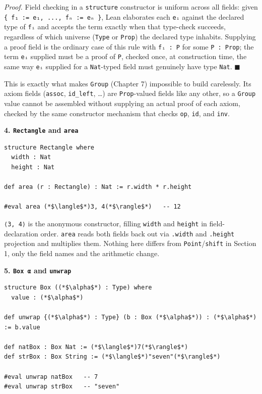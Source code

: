 \emph{Proof.} Field checking in a \texttt{structure} constructor is uniform across all fields: given \texttt{\{ f₁ := e₁, ..., fₙ := eₙ \}}, Lean elaborates each \texttt{eᵢ} against the declared type of \texttt{fᵢ} and accepts the term exactly when that type-check succeeds, regardless of which universe (\texttt{Type} or \texttt{Prop}) the declared type inhabits. Supplying a proof field is the ordinary case of this rule with \texttt{fᵢ : P} for some \texttt{P : Prop}; the term \texttt{eᵢ} supplied must be a proof of \texttt{P}, checked once, at construction time, the same way \texttt{eᵢ} supplied for a \texttt{Nat}-typed field must genuinely have type \texttt{Nat}. \(\blacksquare\)

This is exactly what makes \texttt{Group} (Chapter 7) impossible to build carelessly. Its axiom fields (\texttt{assoc}, \texttt{id\_\allowbreak{}left}, \ldots) are \texttt{Prop}-valued fields like any other, so a \texttt{Group} value cannot be assembled without supplying an actual proof of each axiom, checked by the same constructor mechanism that checks \texttt{op}, \texttt{id}, and \texttt{inv}.

\textbf{4. \texttt{Rectangle} and \texttt{area}}

\begin{lstlisting}
structure Rectangle where
  width : Nat
  height : Nat

def area (r : Rectangle) : Nat := r.width * r.height

#eval area (*$\langle$*)3, 4(*$\rangle$*)   -- 12
\end{lstlisting}

\texttt{⟨3, 4⟩} is the anonymous constructor, filling \texttt{width} and \texttt{height} in field-declaration order. \texttt{area} reads both fields back out via \texttt{.width} and \texttt{.height} projection and multiplies them. Nothing here differs from \texttt{Point}/\texttt{shift} in Section 1, only the field names and the arithmetic change.

\textbf{5. \texttt{Box α} and \texttt{unwrap}}

\begin{lstlisting}
structure Box ((*$\alpha$*) : Type) where
  value : (*$\alpha$*)

def unwrap {(*$\alpha$*) : Type} (b : Box (*$\alpha$*)) : (*$\alpha$*) := b.value

def natBox : Box Nat := (*$\langle$*)7(*$\rangle$*)
def strBox : Box String := (*$\langle$*)"seven"(*$\rangle$*)

#eval unwrap natBox   -- 7
#eval unwrap strBox   -- "seven"
\end{lstlisting}

